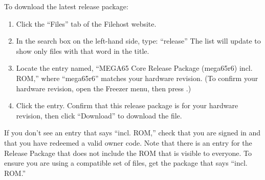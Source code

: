 \begin{center}
\end{center}

To download the latest release package:

\begin{enumerate}
  \item Click the ``Files'' tab of the Filehost website.
  \item In the search box on the left-hand side, type: ``release'' The list will update to show only files with that word in the title.
  \item Locate the entry named, ``MEGA65 Core Release Package (mega65r6) incl. ROM,'' where ``mega65r6'' matches your hardware revision. (To confirm your hardware revision, open the Freezer menu, then press .)
  \item Click the entry. Confirm that this release package is for your hardware revision, then click ``Download'' to download the file.
\end{enumerate}

If you don't see an entry that says ``incl. ROM,'' check that you are signed in and that you have redeemed a valid owner code. Note that there is an entry for the Release Package that does not include the ROM that is visible to everyone. To ensure you are using a compatible set of files, get the package that says ``incl. ROM.''

\begin{center}
\end{center}

